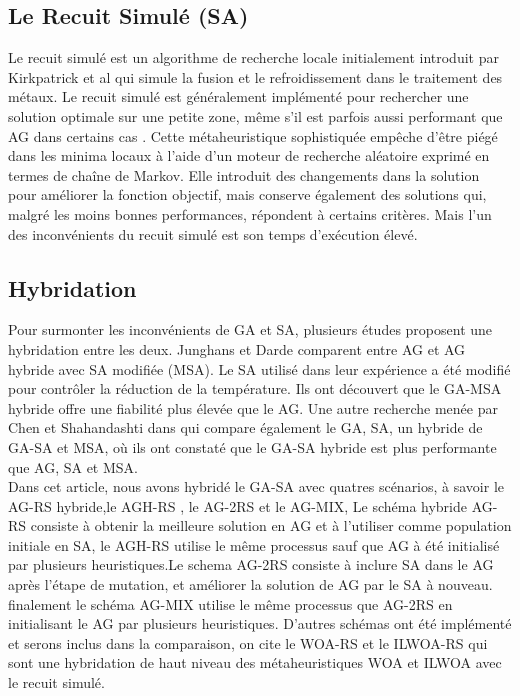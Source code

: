 \documentclass[preprint,12pt]{elsarticle}
\begin{document}
\subsection{Le Recuit Simulé (SA)}
Le recuit simulé est un algorithme de recherche locale initialement introduit par Kirkpatrick et al \cite{kirk} qui simule la fusion et le refroidissement dans le traitement des métaux. Le recuit simulé est généralement implémenté pour rechercher une solution optimale sur une petite zone, même s'il est parfois aussi performant que AG dans certains cas \cite{Alkhateeb}.
Cette métaheuristique sophistiquée empêche d'être piégé dans les minima locaux à l'aide d'un moteur de recherche aléatoire exprimé en termes de chaîne de Markov. Elle introduit des changements dans la solution pour améliorer la fonction objectif, mais conserve également des solutions qui, malgré les moins bonnes performances, répondent à certains critères. Mais l’un des inconvénients du recuit simulé est son temps d'exécution élevé. 

\subsection{Hybridation}
Pour surmonter les inconvénients  de GA et SA, plusieurs études proposent une hybridation entre les deux.
Junghans et Darde \cite{Junghans} comparent entre AG et AG hybride avec SA modifiée (MSA).
Le SA utilisé dans leur expérience a été modifié pour contrôler la réduction de la température.
Ils ont découvert que le GA-MSA hybride offre une fiabilité plus élevée que le AG.
Une autre recherche menée par Chen et Shahandashti dans \cite{Chen} qui compare également le GA, SA, un hybride de GA-SA et MSA, où ils ont constaté que le GA-SA hybride est plus performante que AG, SA et MSA. \\
Dans cet article, nous avons hybridé le GA-SA avec quatres scénarios, à savoir le AG-RS hybride,le AGH-RS , le AG-2RS et le AG-MIX, Le schéma hybride AG-RS consiste à obtenir la meilleure solution en AG et à l'utiliser comme population initiale en SA,
le AGH-RS utilise le même processus sauf que AG à été initialisé par plusieurs heuristiques.Le schema AG-2RS  consiste à inclure SA dans le AG après l’étape de mutation, et améliorer la solution de AG par le SA à nouveau. finalement le schéma AG-MIX utilise le même processus que AG-2RS en initialisant le AG par plusieurs heuristiques. 
D’autres schémas ont été implémenté et serons inclus dans la comparaison, on cite le WOA-RS  et le ILWOA-RS qui sont une hybridation de haut niveau des métaheuristiques WOA et ILWOA avec le recuit simulé.
\end{document}
